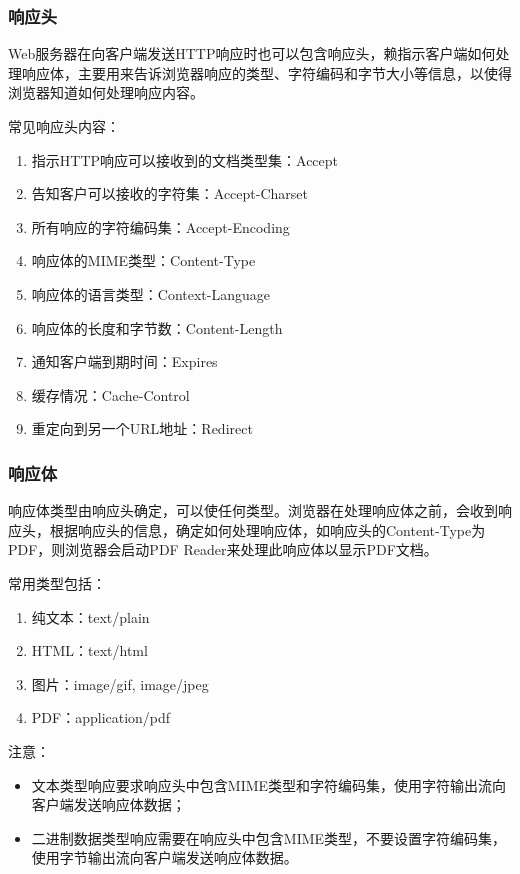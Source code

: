 \begin{frame}[fragile] %
\frametitle{响应头} 

Web服务器在向客户端发送HTTP响应时也可以包含响应头，赖指示客户端如何处理响应体，主要用来告诉浏览器响应的类型、字符编码和字节大小等信息，以使得浏览器知道如何处理响应内容。

常见响应头内容：
\begin{enumerate}
\item 指示HTTP响应可以接收到的文档类型集：Accept
\item 告知客户可以接收的字符集：Accept-Charset
\item 所有响应的字符编码集：Accept-Encoding
\item 响应体的MIME类型：Content-Type
\item 响应体的语言类型：Context-Language
\item 响应体的长度和字节数：Content-Length
\item 通知客户端到期时间：Expires 
\item 缓存情况：Cache-Control
\item 重定向到另一个URL地址：Redirect
\end{enumerate}
\end{frame}

\begin{frame}[fragile] %
\frametitle{响应体} 

响应体类型由响应头确定，可以使任何类型。浏览器在处理响应体之前，会收到响应头，根据响应头的信息，确定如何处理响应体，如响应头的Content-Type为PDF，则浏览器会启动PDF Reader来处理此响应体以显示PDF文档。

常用类型包括：
\begin{enumerate}
\item 纯文本：text/plain
\item HTML：text/html
\item 图片：image/gif, image/jpeg
\item PDF：application/pdf
\end{enumerate}

注意：
\begin{itemize}\kai
\item 文本类型响应要求响应头中包含MIME类型和字符编码集，使用{\hei 字符输出流}向客户端发送响应体数据；
\item 二进制数据类型响应需要在响应头中包含MIME类型，不要设置字符编码集，使用{\hei 字节输出流}向客户端发送响应体数据。
\end{itemize}
\end{frame}

